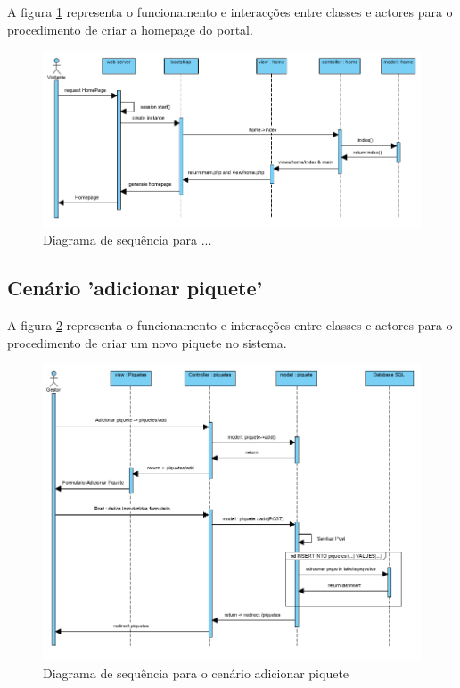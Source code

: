 A figura \ref{fig:sequência_visitante} representa o funcionamento e interacções entre classes e actores para o procedimento de criar a homepage do portal.


\begin{figure}[!htb]
	\centering
	\includegraphics[width=\textwidth]{figuras/sequence_diagram_visitante.png}
	\caption{Diagrama de sequência para ...}
	\label{fig:sequência_visitante}
\end{figure}

\FloatBarrier\subsection{Cenário 'adicionar piquete'}

A figura \ref{fig:sequência_gestor} representa o funcionamento e interacções entre classes e actores para o procedimento de criar um novo piquete no sistema.

\begin{figure}[!htb]
	\centering
	\includegraphics[width=\textwidth]{figuras/sequence_diagram_gestor.png}
	\caption{Diagrama de sequência para o cenário adicionar piquete}
	\label{fig:sequência_gestor}
\end{figure}

